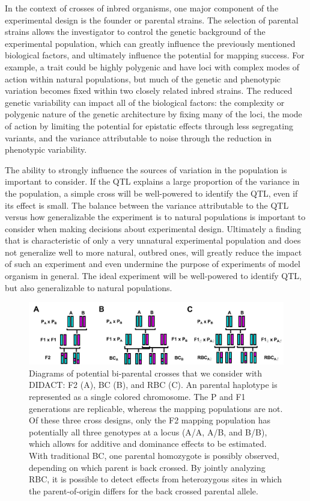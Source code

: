 In the context of crosses of inbred organisms, one major component of the experimental design is the founder or parental strains. The selection of parental strains allows the investigator to control the genetic background of the experimental population, which can greatly influence the previously mentioned biological factors, and ultimately influence the potential for mapping success. For example, a trait could be highly polygenic and have loci with complex modes of action within natural populations, but much of the genetic and phenotypic variation becomes fixed within two closely related inbred strains. The reduced genetic variability can impact all of the biological factors: the complexity or polygenic nature of the genetic architecture by fixing many of the loci, the mode of action by limiting the potential for epistatic effects through less segregating variants, and the variance attributable to noise through the reduction in phenotypic variability. 

The ability to strongly influence the sources of variation in the population is important to consider. If the QTL explains a large proportion of the variance in the population, a simple cross will be well-powered to identify the QTL, even if its effect is small. The balance between the variance attributable to the QTL versus how generalizable the experiment is to natural populations is important to consider when making decisions about experimental design. Ultimately a finding that is characteristic of only a very unnatural experimental population and does not generalize well to more natural, outbred ones, will greatly reduce the impact of such an experiment and even undermine the purpose of experiments of model organism in general. The ideal experiment will be well-powered to identify QTL, but also generalizable to natural populations.

\begin{figure}
\renewcommand{\familydefault}{\sfdefault}\normalfont
\centering
\includegraphics[width=\textwidth]{figures/2-didact/biparental_crosses.pdf}
\caption[Diagrams of bi-parental crosses]{Diagrams of potential bi-parental crosses that we consider with DIDACT: F2 (A), BC (B), and RBC (C). An parental haplotype is represented as a single colored chromosome. The P and F1 generations are replicable, whereas the mapping populations are not. Of these three cross designs, only the F2 mapping population has potentially all three genotypes at a locus (A/A, A/B, and B/B), which allows for additive and dominance effects to be estimated. With traditional BC, one parental homozygote is possibly observed, depending on which parent is back crossed. By jointly analyzing RBC, it is possible to detect effects from heterozygous sites in which the parent-of-origin differs for the back crossed parental allele.\label{fig:biparental_crosses}}
\end{figure}

